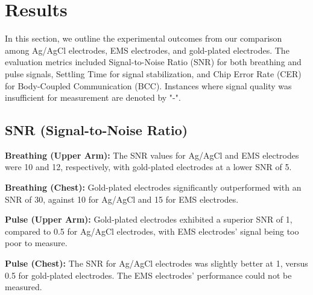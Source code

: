 \documentclass[conference]{IEEEtran}
\begin{document}



%

\section{Results}

In this section, we outline the experimental outcomes from our comparison among Ag/AgCl electrodes, EMS electrodes, and gold-plated electrodes. The evaluation metrics included Signal-to-Noise Ratio (SNR) for both breathing and pulse signals, Settling Time for signal stabilization, and Chip Error Rate (CER) for Body-Coupled Communication (BCC). Instances where signal quality was insufficient for measurement are denoted by "-".

\subsection{SNR (Signal-to-Noise Ratio)}

 \textbf{Breathing (Upper Arm):} The SNR values for Ag/AgCl and EMS electrodes were 10 and 12, respectively, with gold-plated electrodes at a lower SNR of 5.
 
\textbf{Breathing (Chest):} Gold-plated electrodes significantly outperformed with an SNR of 30, against 10 for Ag/AgCl and 15 for EMS electrodes.

 \textbf{Pulse (Upper Arm):} Gold-plated electrodes exhibited a superior SNR of 1, compared to 0.5 for Ag/AgCl electrodes, with EMS electrodes' signal being too poor to measure.

 \textbf{Pulse (Chest):} The SNR for Ag/AgCl electrodes was slightly better at 1, versus 0.5 for gold-plated electrodes. The EMS electrodes' performance could not be measured.
\end{document}
